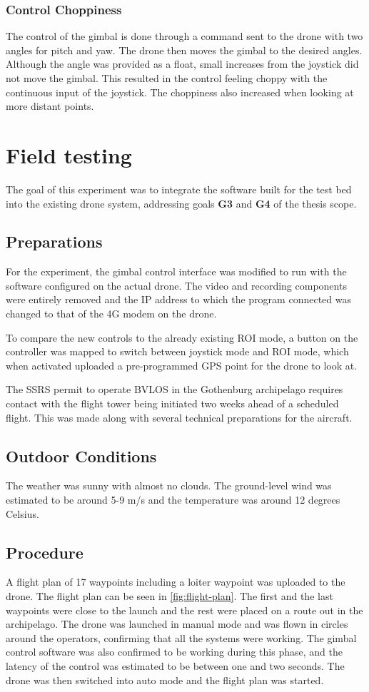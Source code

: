 \documentclass[nofilelist]{cslthse-msc}
\begin{document}
\subsubsection{Control Choppiness}
\label{sec:control-choppiness}
The control of the gimbal is done through a command sent to the drone with two angles for pitch and yaw. The drone then moves the gimbal to the desired angles. Although the angle was provided as a float, small increases from the joystick did not move the gimbal. This resulted in the control feeling choppy with the continuous input of the joystick. The choppiness also increased when looking at more distant points. 

\section{Field testing}
The goal of this experiment was to integrate the software built for the test bed into the existing drone system, addressing goals \textbf{G3} and \textbf{G4} of the thesis scope. 

\subsection{Preparations}
For the experiment, the gimbal control interface was modified to run with the software configured on the actual drone. The video and recording components were entirely removed and the IP address to which the program connected was changed to that of the 4G modem on the drone.

To compare the new controls to the already existing ROI mode, a button on the controller was mapped to switch between joystick mode and ROI mode, which when activated uploaded a pre-programmed GPS point for the drone to look at.

The SSRS permit to operate BVLOS in the Gothenburg archipelago requires contact with the flight tower being initiated two weeks ahead of a scheduled flight. This was made along with several technical preparations for the aircraft.

\subsection{Outdoor Conditions}
The weather was sunny with almost no clouds. The ground-level wind was estimated to be around 5-9 m/s and the temperature was around 12 degrees Celsius.

\subsection{Procedure}
A flight plan of 17 waypoints including a loiter waypoint was uploaded to the drone. The flight plan can be seen in \ref{fig:flight-plan}. The first and the last waypoints were close to the launch and the rest were placed on a route out in the archipelago. The drone was launched in manual mode and was flown in circles around the operators, confirming that all the systems were working. The gimbal control software was also confirmed to be working during this phase, and the latency of the control was estimated to be between one and two seconds. The drone was then switched into auto mode and the flight plan was started.
\end{document}
